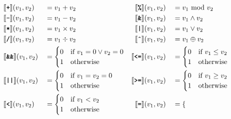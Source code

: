 \begin{figure}[ht]
    \begin{align*}
        &\llbracket \texttt{\textbf{+}} \rrbracket (v_1, v_2) &&= v_1 + v_2 &\llbracket \texttt{\textbf{\%}} \rrbracket (v_1, v_2)      &&&= v_1\ \text{mod}\ v_2\\
        &\llbracket \texttt{\textbf{-}} \rrbracket (v_1, v_2) &&= v_1 - v_2 &\llbracket \texttt{\textbf{\&}} \rrbracket (v_1, v_2)       &&&= v_1 \wedge v_2\\
        &\llbracket \texttt{\textbf{*}} \rrbracket (v_1, v_2) &&= v_1 \times v_2 &\llbracket \texttt{\textbf{|}} \rrbracket  (v_1, v_2) &&&= v_1 \vee v_2\\
        &\llbracket \texttt{\textbf{/}} \rrbracket (v_1, v_2) &&= v_1 \div v_2 &\llbracket \texttt{\textbf{\^}} \rrbracket (v_1, v_2)   &&&= v_1 \oplus v_2\\ 
        &\llbracket\texttt{\textbf{\&\&}}\rrbracket (v_1, v_2) &&= \begin{cases} 
            0 & \text{if}\ v_1 = 0 \vee v_2 = 0\\ 
            1 & \text{otherwise}
        \end{cases}        
        &\llbracket\texttt{\textbf{<=}}\rrbracket (v_1, v_2) &&&= \begin{cases} 
            0 & \text{if}\ v_1 \leq v_2\\ 
            1 & \text{otherwise} 
        \end{cases}\\
        &\llbracket\texttt{\textbf{||}}\rrbracket (v_1, v_2) &&= \begin{cases}
            0 & \text{if}\ v_1 = v_2 = 0\\ 
            1 & \text{otherwise}
        \end{cases}
        &\llbracket\texttt{\textbf{>=}}\rrbracket (v_1, v_2) &&&= \begin{cases}
            0 & \text{if}\ v_1 \geq v_2\\
            1 & \text{otherwise}
        \end{cases}\\
        &\llbracket\texttt{\textbf{<}}\rrbracket (v_1, v_2) &&= \begin{cases}
            0 & \text{if}\ v_1 < v_2\\ 
            1 & \text{otherwise}
        \end{cases}
        &\llbracket\texttt{\textbf{=}}\rrbracket (v_1, v_2) &&&= \begin{cases}

\end{cases}
\end{align*}
\end{figure}
